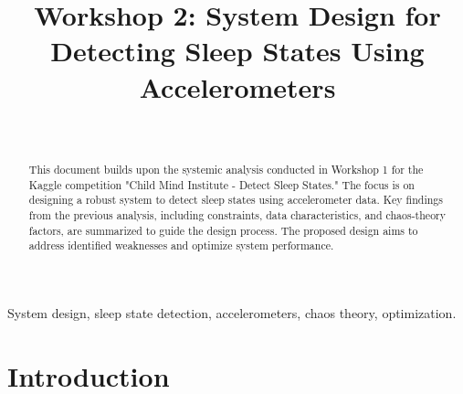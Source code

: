 \documentclass[conference]{IEEEtran}
\begin{document}
\title{Workshop 2: System Design for Detecting Sleep States Using Accelerometers}

\author{
    \\
    \and
    }

\maketitle

\begin{abstract}
    This document builds upon the systemic analysis conducted in Workshop 1 for the Kaggle competition "Child Mind Institute - Detect Sleep States." The focus is on designing a robust system to detect sleep states using accelerometer data. Key findings from the previous analysis, including constraints, data characteristics, and chaos-theory factors, are summarized to guide the design process. The proposed design aims to address identified weaknesses and optimize system performance.
    \end{abstract}
    
    \begin{IEEEkeywords}
    System design, sleep state detection, accelerometers, chaos theory, optimization.
    \end{IEEEkeywords}
    
    \section{Introduction}
\end{document}
